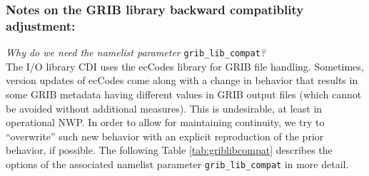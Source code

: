 \subsubsection{Notes on the GRIB library backward compatiblity adjustment:}\label{subsec:griblibcompat}


\emph{Why do we need the namelist parameter} \texttt{grib\_lib\_compat}\emph{?}\\
The I/O library CDI uses the ecCodes library for GRIB file handling.
Sometimes, version updates of ecCodes come along with a change in behavior
that results in some GRIB metadata having different values in GRIB output files (which cannot be avoided without additional measures).
This is undesirable, at least in operational NWP.
In order to allow for maintaining continuity, we try to ``overwrite'' such new behavior with an explicit reproduction of the prior behavior, if possible.
The following Table \ref{tab:griblibcompat} describes the options of the associated namelist parameter \texttt{grib\_lib\_compat}
in more detail.


